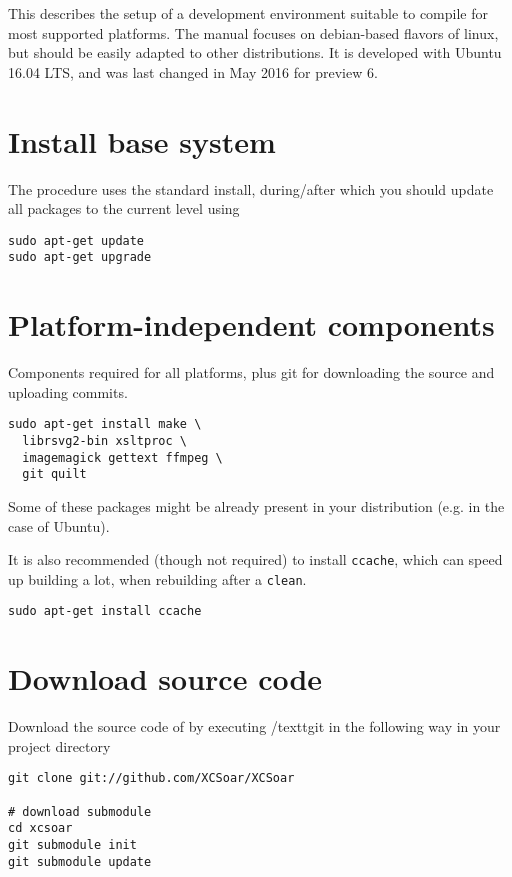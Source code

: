 This describes the setup of a development environment suitable to compile \xc for most supported platforms. The manual focuses on debian-based flavors of linux, but should be easily adapted to other distributions. It is developed with Ubuntu 16.04 LTS, and was last changed in May 2016 for  preview  6.

\section{Install base system}\label{sec:developsetup-base}
The procedure uses the standard install, during/after which you should update all packages to the current level using

\begin{verbatim}
sudo apt-get update
sudo apt-get upgrade
\end{verbatim}

\section{Platform-independent components}\label{sec:developsetup-general}

Components required for all platforms, plus git for downloading the source and uploading commits.

\begin{verbatim}
sudo apt-get install make \
  librsvg2-bin xsltproc \
  imagemagick gettext ffmpeg \
  git quilt
\end{verbatim}
Some of these packages might be already present in your distribution (e.g. in the case of Ubuntu).

It is also recommended (though not required) to install \texttt{ccache}, which can speed up building a lot, when rebuilding after a \texttt{clean}.
\begin{verbatim}
sudo apt-get install ccache
\end{verbatim}


\section{Download source code}\label{sec:developsetup-sourcecode}

Download the source code of \xc by executing /textt{git} in the following way in your project directory
\begin{verbatim}
git clone git://github.com/XCSoar/XCSoar

# download submodule
cd xcsoar
git submodule init
git submodule update
\end{verbatim}

